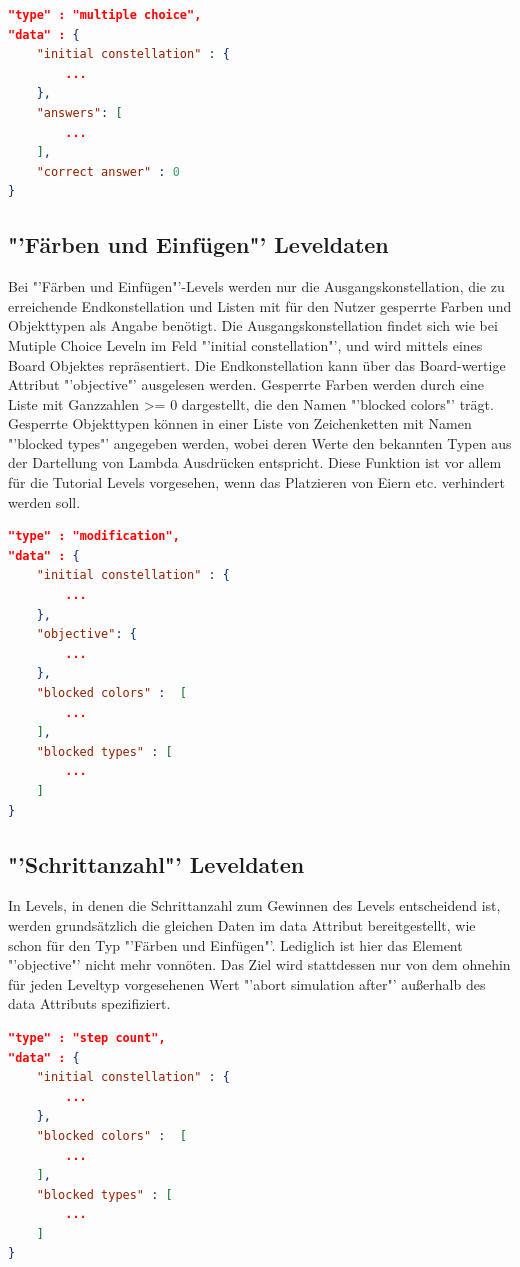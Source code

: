 \begin{lstlisting}[language=json,caption={Grober Aufbau des data Attributs eines Multiple Choice Levels}]
"type" : "multiple choice",
"data" : {
	"initial constellation" : {
		...
	},
	"answers": [
		...
	],
	"correct answer" : 0
}
\end{lstlisting}

\subsection{"'Färben und Einfügen"' Leveldaten}
Bei "'Färben und Einfügen"'-Levels werden nur die Ausgangskonstellation, die zu erreichende Endkonstellation und Listen mit für den Nutzer gesperrte Farben und Objekttypen als Angabe benötigt.
Die Ausgangskonstellation findet sich wie bei Mutiple Choice Leveln im Feld "'initial constellation"', und wird mittels eines Board Objektes repräsentiert.
Die Endkonstellation kann über das Board-wertige Attribut "'objective"' ausgelesen werden.
Gesperrte Farben werden durch eine Liste mit Ganzzahlen >= 0 dargestellt, die den Namen "'blocked colors"' trägt.
Gesperrte Objekttypen können in einer Liste von Zeichenketten mit Namen "'blocked types"' angegeben werden, wobei deren Werte den bekannten Typen aus der Dartellung von Lambda Ausdrücken entspricht.
Diese Funktion ist vor allem für die Tutorial Levels vorgesehen, wenn das Platzieren von Eiern etc. verhindert werden soll.

\begin{lstlisting}[language=json,caption={Grober Aufbau des data Attributs eines "'Färben und Einfügen"' Levels}]
"type" : "modification",
"data" : {
	"initial constellation" : {
		...
	},
	"objective": {
		...
	},
	"blocked colors" :  [
		...
	],
	"blocked types" : [
		...
	]
}
\end{lstlisting}

\subsection{"'Schrittanzahl"' Leveldaten}
In Levels, in denen die Schrittanzahl zum Gewinnen des Levels entscheidend ist, werden grundsätzlich die gleichen Daten im data Attribut bereitgestellt, wie schon für den Typ "'Färben und Einfügen"'.
Lediglich ist hier das Element "'objective"' nicht mehr vonnöten.
Das Ziel wird stattdessen nur von dem ohnehin für jeden Leveltyp vorgesehenen Wert "'abort simulation after"' außerhalb des data Attributs spezifiziert.

\begin{lstlisting}[language=json,caption={Grober Aufbau des data Attributs eines "'Schrittzahl"' Levels}]
"type" : "step count",
"data" : {
	"initial constellation" : {
		...
	},
	"blocked colors" :  [
		...
	],
	"blocked types" : [
		...
	]
}
\end{lstlisting}

